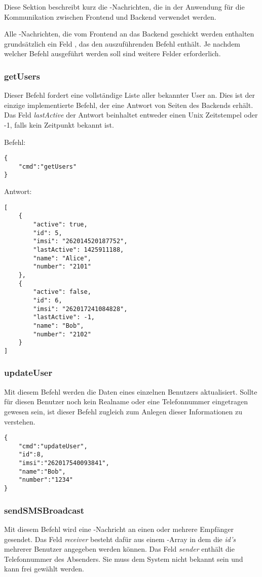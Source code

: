 Diese Sektion beschreibt kurz die \JSON-Nachrichten, die in der Anwendung für die Kommunikation zwischen Frontend und Backend verwendet werden.

Alle \JSON-Nachrichten, die vom Frontend an das Backend geschickt werden enthalten grundsätzlich ein Feld , das den auszuführenden Befehl enthält. Je nachdem welcher Befehl ausgeführt werden soll sind weitere Felder erforderlich.

\subsubsection*{getUsers}
Dieser Befehl fordert eine vollständige Liste aller bekannter User an. Dies ist der einzige implementierte Befehl, der eine Antwort von Seiten des Backends erhält. Das Feld \textit{lastActive} der Antwort beinhaltet entweder einen Unix Zeitstempel oder -1, falls kein Zeitpunkt bekannt ist.

\textbullet \space Befehl:

\begin{lstlisting}[style=json]
{
	"cmd":"getUsers"
}
\end{lstlisting}

\textbullet \space Antwort:

\begin{lstlisting}[style=json]
[
	{
		"active": true,
		"id": 5,
		"imsi": "262014520187752",
		"lastActive": 1425911188,
		"name": "Alice",
		"number": "2101"
	},
	{
		"active": false,
		"id": 6,
		"imsi": "262017241084828",
		"lastActive": -1,
		"name": "Bob",
		"number": "2102"
	}
]
\end{lstlisting}

\subsubsection*{updateUser}

Mit diesem Befehl werden die Daten eines einzelnen Benutzers aktualisiert. Sollte für diesen Benutzer noch kein Realname oder eine Telefonnummer eingetragen gewesen sein, ist dieser Befehl zugleich zum Anlegen dieser Informationen zu verstehen.

\begin{lstlisting}[style=json]
{
	"cmd":"updateUser",
	"id":8,
	"imsi":"262017540093841",
	"name":"Bob",
	"number":"1234"
}
\end{lstlisting}


\subsubsection*{sendSMSBroadcast}
Mit diesem Befehl wird eine \SMS-Nachricht an einen oder mehrere Empfänger gesendet. Das Feld \textit{receiver} besteht dafür aus einem \JSON-Array in dem die \textit{id's} mehrerer Benutzer angegeben werden können. Das Feld \textit{sender} enthält die Telefonnummer des Absenders. Sie muss dem System nicht bekannt sein und kann frei gewählt werden.


